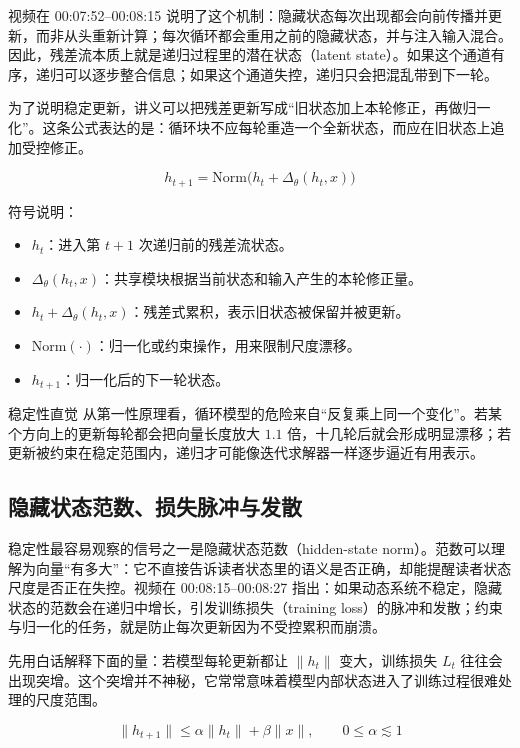 ﻿\documentclass[a4paper]{article}
\begin{document}
视频在 00:07:52--00:08:15 说明了这个机制：隐藏状态每次出现都会向前传播并更新，而非从头重新计算；每次循环都会重用之前的隐藏状态，并与注入输入混合。因此，残差流本质上就是递归过程里的潜在状态（latent state）。如果这个通道有序，递归可以逐步整合信息；如果这个通道失控，递归只会把混乱带到下一轮。

为了说明稳定更新，讲义可以把残差更新写成“旧状态加上本轮修正，再做归一化”。这条公式表达的是：循环块不应每轮重造一个全新状态，而应在旧状态上追加受控修正。

\[
h_{t+1}=\mathrm{Norm}\bigl(h_t+\Delta_\theta(h_t,x)\bigr)
\]

符号说明：
\begin{itemize}
  \item \(h_t\)：进入第 \(t+1\) 次递归前的残差流状态。
  \item \(\Delta_\theta(h_t,x)\)：共享模块根据当前状态和输入产生的本轮修正量。
  \item \(h_t+\Delta_\theta(h_t,x)\)：残差式累积，表示旧状态被保留并被更新。
  \item \(\mathrm{Norm}(\cdot)\)：归一化或约束操作，用来限制尺度漂移。
  \item \(h_{t+1}\)：归一化后的下一轮状态。
\end{itemize}

\begin{knowledgebox}{稳定性直觉}
从第一性原理看，循环模型的危险来自“反复乘上同一个变化”。若某个方向上的更新每轮都会把向量长度放大 \(1.1\) 倍，十几轮后就会形成明显漂移；若更新被约束在稳定范围内，递归才可能像迭代求解器一样逐步逼近有用表示。
\end{knowledgebox}

\subsection{隐藏状态范数、损失脉冲与发散}

稳定性最容易观察的信号之一是隐藏状态范数（hidden-state norm）。范数可以理解为向量“有多大”：它不直接告诉读者状态里的语义是否正确，却能提醒读者状态尺度是否正在失控。视频在 00:08:15--00:08:27 指出：如果动态系统不稳定，隐藏状态的范数会在递归中增长，引发训练损失（training loss）的脉冲和发散；约束与归一化的任务，就是防止每次更新因为不受控累积而崩溃。

先用白话解释下面的量：若模型每轮更新都让 \(\lVert h_t\rVert\) 变大，训练损失 \(L_t\) 往往会出现突增。这个突增并不神秘，它常常意味着模型内部状态进入了训练过程很难处理的尺度范围。

\[
\lVert h_{t+1}\rVert \le \alpha \lVert h_t\rVert+\beta \lVert x\rVert,\qquad 0\le \alpha \lesssim 1
\]
\end{document}
